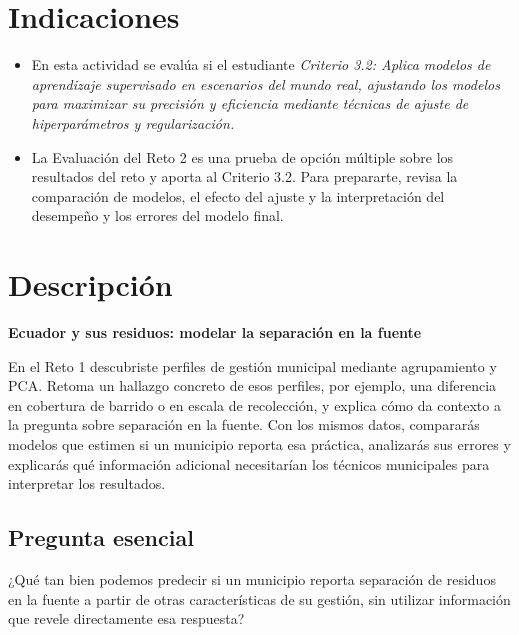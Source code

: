 \documentclass[a4,11pt]{aleph-notas}
\begin{document}
\encabezado

\section{Indicaciones}
\begin{itemize}[leftmargin=*]
\item 
    En esta actividad se evalúa si el estudiante \textit{Criterio 3.2: Aplica modelos de aprendizaje supervisado en escenarios del mundo real, ajustando los modelos para maximizar su precisión y eficiencia mediante técnicas de ajuste de hiperparámetros y regularización.}
\item
    La Evaluación del Reto 2 es una prueba de opción múltiple sobre los resultados del reto y aporta al Criterio 3.2. Para prepararte, revisa la comparación de modelos, el efecto del ajuste y la interpretación del desempeño y los errores del modelo final.
\end{itemize}


\section{Descripción}

\begin{center}
    \large\bf Ecuador y sus residuos: modelar la separación en la fuente
\end{center}

En el Reto 1 descubriste perfiles de gestión municipal mediante agrupamiento y PCA. Retoma un hallazgo concreto de esos perfiles, por ejemplo, una diferencia en cobertura de barrido o en escala de recolección, y explica cómo da contexto a la pregunta sobre separación en la fuente. Con los mismos datos, compararás modelos que estimen si un municipio reporta esa práctica, analizarás sus errores y explicarás qué información adicional necesitarían los técnicos municipales para interpretar los resultados.

\subsection*{Pregunta esencial}
¿Qué tan bien podemos predecir si un municipio reporta separación de residuos en la fuente a partir de otras características de su gestión, sin utilizar información que revele directamente esa respuesta?
\end{document}
